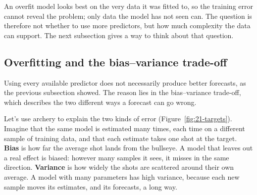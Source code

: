 An overfit model looks best on the very data it was fitted to, so the training error cannot reveal the problem; only data the model has not seen can. The question is therefore not whether to use more predictors, but how much complexity the data can support. The next subsection gives a way to think about that question.

\subsection{Overfitting and the bias--variance trade-off}
\label{sec:21-biasvar}

Using every available predictor does not necessarily produce better forecasts, as the previous subsection showed. The reason lies in the bias--variance trade-off, which describes the two different ways a forecast can go wrong.

Let's use archery to explain the two kinds of error (Figure~\ref{fig:21-targets}). Imagine that the same model is estimated many times, each time on a different sample of training data, and that each estimate takes one shot at the target. \textbf{Bias} is how far the average shot lands from the bullseye. A model that leaves out a real effect is biased: however many samples it sees, it misses in the same direction. \textbf{Variance} is how widely the shots are scattered around their own average. A model with many parameters has high variance, because each new sample moves its estimates, and its forecasts, a long way.


